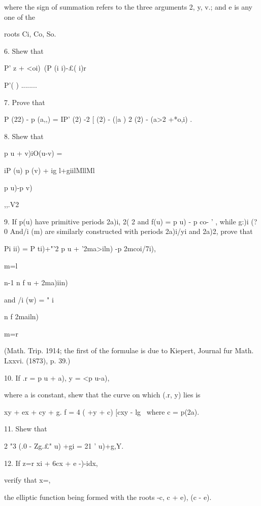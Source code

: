 {where the sign of summation refers to the three arguments 2, y, v.;
and e is any one of the

roots Ci, Co, So.


6. Shew that

P' z + <oi)\ (P (i i)-£( i)r

P'( ) ........


7. Prove that

P (22) - p (a,,) = IP' (2) -2 [ (2) - (|a ) 2 (2) - (a>2 +*o,i) .


8. Shew that

p u + v)iO(u-v) =

iP (u) p (v) + ig l+giilMllMl

 p u)-p v)

,,.V2


9. If p(u) have primitive periods 2a)i, 2( 2 and f(u) = p u) - p co- '
, while g:)i (?0 And/i (m) are similarly constructed with periods
2a)i/yi and 2a)2, prove that

Pi ii) = P ti)+"'2 p u + '2ma>iln) -p 2mcoi/7i),

m=l

n-1 n f u + 2ma)iin)

 and /i (w) = " i 

n f 2mailn)

m=r

(Math. Trip. 1914; the first of the formulae is due to Kiepert,
Journal fur Math. Lxxvi. (1873), p. 39.)

%
%

10. If .r = p u + a), y = <p u-a),

where a is constant, shew that the curve on which (.r, y) lies is

 xy + ex + cy + g. f = 4 ( +y + c) [cxy - lg \ where c = p(2a).


11. Shew that

2 "3 (.0 - Zg.£" u) +gi = 21 ' u)+g,Y.

12. If z=r xi + 6cx + e -)-idx,

verify that x=,

the elliptic function being formed with the roots -c, c + e), (c - e).

}
